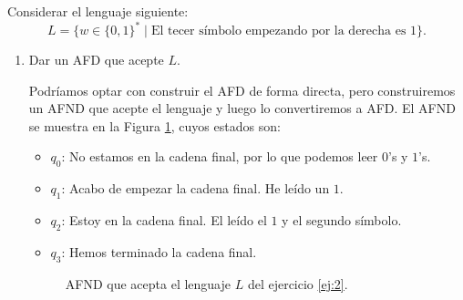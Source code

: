 \documentclass[12pt]{article}
\begin{document}
    \begin{ejercicio} \label{ej:2}
        Considerar el lenguaje siguiente:
        \begin{equation*}
            L=\{w \in \{0,1\}^* \mid \text{El tecer símbolo empezando por la derecha es } 1\}.
        \end{equation*}
        \begin{enumerate}
            \item Dar un AFD que acepte $L$.
            
            Podríamos optar con construir el AFD de forma directa, pero construiremos un AFND que acepte el lenguaje y luego lo convertiremos a AFD. El AFND se muestra en la Figura \ref{fig:ej:2:AFND}, cuyos estados son:
            \begin{itemize}
                \item $q_0$: No estamos en la cadena final, por lo que podemos leer $0$'s y $1$'s.
                \item $q_1$: Acabo de empezar la cadena final. He leído un $1$.
                \item $q_2$: Estoy en la cadena final. El leído el $1$ y el segundo símbolo.
                \item $q_3$: Hemos terminado la cadena final.
            \end{itemize}
            \begin{figure}[H]
                \centering
                \caption{AFND que acepta el lenguaje $L$ del ejercicio \ref{ej:2}.}
                \label{fig:ej:2:AFND}
            \end{figure}


\end{enumerate}
\end{ejercicio}
\end{document}
